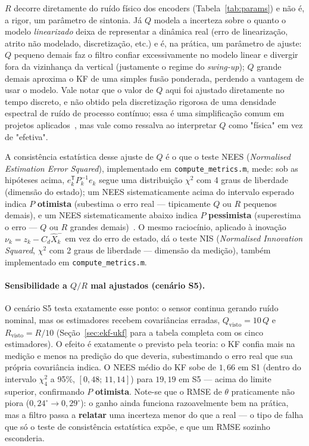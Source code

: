 \documentclass[brazil, 12pt]{article}
\begin{document}
$R$ decorre diretamente do ruído físico dos encoders (Tabela~\ref{tab:params}) e
não é, a rigor, um parâmetro de sintonia. Já $Q$ modela a incerteza sobre o
quanto o modelo \emph{linearizado} deixa de representar a dinâmica real
(erro de linearização, atrito não modelado, discretização, etc.) e é, na
prática, um parâmetro de ajuste: $Q$ pequeno demais faz o filtro confiar
excessivamente no modelo linear e divergir fora da vizinhança da vertical
(justamente o regime do \emph{swing-up}); $Q$ grande demais aproxima o KF de
uma simples fusão ponderada, perdendo a vantagem de usar o modelo. Vale notar
que o valor de $Q$ aqui foi ajustado diretamente no tempo discreto, e não
obtido pela discretização rigorosa de uma densidade espectral de ruído de
processo contínuo; essa é uma simplificação comum em projetos
aplicados~\cite{simon2006}, mas vale
como ressalva ao interpretar $Q$ como "física" em vez de "efetiva".

A consistência estatística desse ajuste de $Q$ é o que o teste NEES
(\emph{Normalised Estimation Error Squared}), implementado em
\texttt{compute\_metrics.m}, mede: sob as hipóteses acima, $e_k^{\mathsf T}P_k^{-1}e_k$
segue uma distribuição $\chi^2$ com 4 graus de liberdade (dimensão do estado); um
NEES sistematicamente acima do intervalo esperado indica $P$
\textbf{otimista} (subestima o erro real — tipicamente $Q$ ou $R$ pequenos
demais), e um NEES sistematicamente abaixo indica $P$ \textbf{pessimista}
(superestima o erro — $Q$ ou $R$ grandes demais)~\cite{simon2006}. O mesmo
raciocínio, aplicado à inovação $\nu_k=z_k-C_d\hat X_k^{-}$ em vez do erro de
estado, dá o teste NIS (\emph{Normalised Innovation Squared}, $\chi^2$ com 2
graus de liberdade — dimensão da medição), também implementado em
\texttt{compute\_metrics.m}.

\paragraph{Sensibilidade a $Q/R$ mal ajustados (cenário S5).} O cenário S5
testa exatamente esse ponto: o sensor continua gerando ruído nominal, mas os
estimadores recebem covariâncias erradas, $Q_{\text{visto}}=10\,Q$ e
$R_{\text{visto}}=R/10$ (Seção~\ref{sec:ekf-ukf} para a tabela completa com os
cinco estimadores). O efeito é exatamente o previsto pela teoria: o KF confia
mais na medição e menos na predição do que deveria, subestimando o erro real
que sua própria covariância indica. O NEES médio do KF sobe de
$1{,}66$ em S1 (dentro do intervalo $\chi^2_4$ a 95\%, $[0{,}48;\,11{,}14]$)
para $19{,}19$ em S5 — acima do limite superior, confirmando $P$
\textbf{otimista}. Note-se que o RMSE de $\theta$ praticamente não piora
($0{,}24^{\circ}\to0{,}29^{\circ}$): o ganho ainda funciona razoavelmente bem
na prática, mas a filtro passa a \textbf{relatar} uma incerteza menor do que a
real — o tipo de falha que só o teste de consistência estatística expõe, e que
um RMSE sozinho esconderia.
\end{document}
